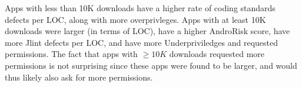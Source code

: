 \documentclass{sig-alternate}
\begin{document}

%
%
%


Apps with less than 10K downloads have a higher rate of coding standards defects per LOC, along with more overprivleges. Apps with at least 10K downloads were larger (in terms of LOC), have a higher AndroRisk score, have more Jlint defects per LOC, and have more Underpriviledges and requested permissions. The fact that apps with $\geq 10K$ downloads requested more permissions is not surprising since these apps were found to be larger, and would thus likely also ask for more permissions. %




\end{document}
